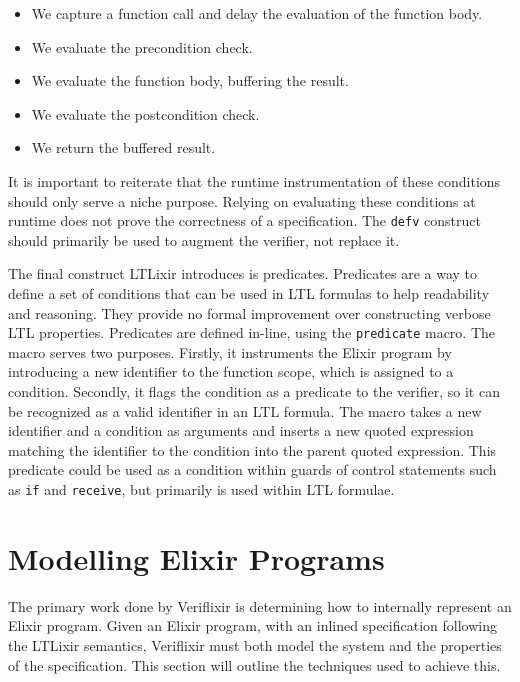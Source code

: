 \begin{itemize}
    \item We capture a function call and delay the evaluation of the function body.
    \item We evaluate the precondition check.
    \item We evaluate the function body, buffering the result.
    \item We evaluate the postcondition check.
    \item We return the buffered result.
\end{itemize}
It is important to reiterate that the runtime instrumentation of these conditions should only serve a niche purpose. Relying on evaluating these conditions at runtime does not prove the correctness of a specification. The \texttt{defv} construct should primarily be used to augment the verifier, not replace it.
\par
The final construct LTLixir introduces is predicates. Predicates are a way to define a set of conditions that can be used in LTL formulas to help readability and reasoning. They provide no formal improvement over constructing verbose LTL properties. Predicates are defined in-line, using the \texttt{predicate} macro. The macro serves two purposes. Firstly, it instruments the Elixir program by introducing a new identifier to the function scope, which is assigned to a condition. Secondly, it flags the condition as a predicate to the verifier, so it can be recognized as a valid identifier in an LTL formula. The macro takes a new identifier and a condition as arguments and inserts a new quoted expression matching the identifier to the condition into the parent quoted expression. This predicate could be used as a condition within guards of control statements such as \texttt{if} and \texttt{receive}, but primarily is used within LTL formulae.

\section{Modelling Elixir Programs} \label{sec:modelling_elixir_programs}
The primary work done by Veriflixir is determining how to internally represent an Elixir program. Given an Elixir program, with an inlined specification following the LTLixir semantics, Veriflixir must both model the system and the properties of the specification. This section will outline the techniques used to achieve this.
